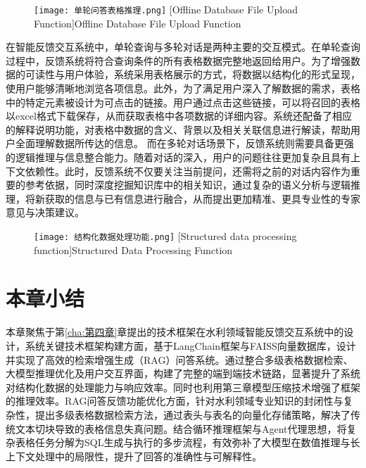 \begin{figure}[htb]
    \centering
    \texttt{[image: 单轮问答表格推理.png]}
    [Offline Database File Upload Function]{Offline Database File Upload Function}
    \label{fig:单轮问答}
\end{figure}
在智能反馈交互系统中，单轮查询与多轮对话是两种主要的交互模式。在单轮查询过程中，反馈系统将符合查询条件的所有表格数据完整地返回给用户。为了增强数据的可读性与用户体验，系统采用表格展示的方式，将数据以结构化的形式呈现，使用户能够清晰地浏览各项信息。此外，为了满足用户深入了解数据的需求，表格中的特定元素被设计为可点击的链接。用户通过点击这些链接，可以将召回的表格以excel格式下载保存，从而获取表格中各项数据的详细内容。系统还配备了相应的解释说明功能，对表格中数据的含义、背景以及相关关联信息进行解读，帮助用户全面理解数据所传达的信息。
而在多轮对话场景下，反馈系统则需要具备更强的逻辑推理与信息整合能力。随着对话的深入，用户的问题往往更加复杂且具有上下文依赖性。此时，反馈系统不仅要关注当前提问，还需将之前的对话内容作为重要的参考依据，同时深度挖掘知识库中的相关知识，通过复杂的语义分析与逻辑推理，将新获取的信息与已有信息进行融合，从而提出更加精准、更具专业性的专家意见与决策建议。
\begin{figure}[ht]
    \centering
    \texttt{[image: 结构化数据处理功能.png]}
    [Structured data processing function]{Structured Data Processing Function}
    \label{fig:结构化数据}
\end{figure}


\section{本章小结}
本章聚焦于第\ref{cha:第四章}章提出的技术框架在水利领域智能反馈交互系统中的设计，系统关键技术框架构建方面，基于LangChain框架与FAISS向量数据库，设计并实现了高效的检索增强生成（RAG）问答系统。通过整合多级表格数据检索、大模型推理优化及用户交互界面，构建了完整的端到端技术链路，显著提升了系统对结构化数据的处理能力与响应效率。同时也利用第三章模型压缩技术增强了框架的推理效率。RAG问答反馈功能优化方面，针对水利领域专业知识的封闭性与复杂性，提出多级表格数据检索方法，通过表头与表名的向量化存储策略，解决了传统文本切块导致的表格信息失真问题。结合循环推理框架与Agent代理思想，将复杂表格任务分解为SQL生成与执行的多步流程，有效弥补了大模型在数值推理与长上下文处理中的局限性，提升了回答的准确性与可解释性。

